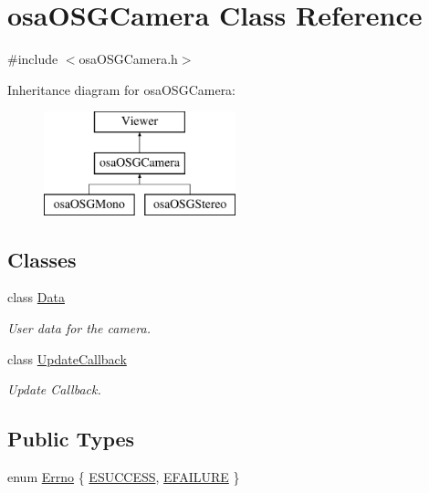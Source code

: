 \hypertarget{classosa_o_s_g_camera}{}\section{osa\+O\+S\+G\+Camera Class Reference}
\label{classosa_o_s_g_camera}


{\ttfamily \#include $<$osa\+O\+S\+G\+Camera.\+h$>$}

Inheritance diagram for osa\+O\+S\+G\+Camera\+:\begin{figure}[H]
\begin{center}
\leavevmode
\includegraphics[height=3.000000cm]{d4/d82/classosa_o_s_g_camera}
\end{center}
\end{figure}
\subsection*{Classes}
\begin{DoxyCompactItemize}
\item 
class \hyperlink{classosa_o_s_g_camera_1_1_data}{Data}
\begin{DoxyCompactList}\small\item\em User data for the camera. \end{DoxyCompactList}\item 
class \hyperlink{classosa_o_s_g_camera_1_1_update_callback}{Update\+Callback}
\begin{DoxyCompactList}\small\item\em Update Callback. \end{DoxyCompactList}\end{DoxyCompactItemize}
\subsection*{Public Types}
\begin{DoxyCompactItemize}
\item 
enum \hyperlink{classosa_o_s_g_camera_ad52eea10482129213b72fc2c49cd47de}{Errno} \{ \hyperlink{classosa_o_s_g_camera_ad52eea10482129213b72fc2c49cd47dea071d69d598088d2662c8e61f1f0bbd77}{E\+S\+U\+C\+C\+E\+S\+S}, 
\hyperlink{classosa_o_s_g_camera_ad52eea10482129213b72fc2c49cd47dea7932133d20cd961c6c6831812b1abc64}{E\+F\+A\+I\+L\+U\+R\+E}
 \}
\end{DoxyCompactItemize}
